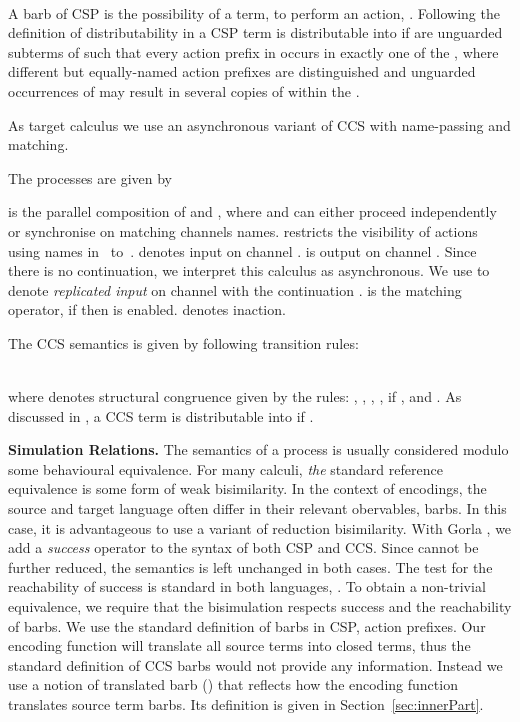 \documentclass[copyright,creativecommons]{eptcs}
\begin{document}
\vspace{-1.0em}\\
A barb of CSP is the possibility of a term, to perform an action, \ie .
Following the definition of distributability in \cite{petersNestmannGoltz13} a CSP term  is distributable into  if  are unguarded subterms of  such that every action prefix in  occurs in exactly one of the , where different but equally-named action prefixes are distinguished and unguarded occurrences of  may result in several copies of  within the .

As target calculus we use an asynchronous variant of CCS\cite{CCS} with name-passing and matching.

\begin{definition}\label{def:ccs_syntax}
  The processes  are given by
  
\end{definition}

 is the parallel composition of  and , where  and  can either proceed independently or synchronise on matching channels names.
 restricts the visibility of actions using names in~ to~.
 denotes input on channel .
 is output on channel .
Since there is no continuation, we interpret this calculus as asynchronous.
We use  to denote \emph{replicated input} on channel  with the continuation .
 is the matching operator, if  then  is enabled.
 denotes inaction.

The CCS semantics is given by following transition rules:
\vspace{-0.6em}

\vspace{-1em}\\
where  denotes structural congruence given by the rules: ,
, , ,  if , and .
As discussed in \cite{petersNestmannGoltz13}, a CCS term  is distributable into  if .

\vspace{0.5em}
\noindent
\textbf{Simulation Relations.}\;
The semantics of a process is usually considered modulo some behavioural equivalence.
For many calculi, \emph{the} standard reference equivalence is some form of weak bisimilarity.
In the context of encodings, the source and target language often differ in their relevant obervables, \ie barbs. In this case, it is advantageous to use a variant of reduction bisimilarity.
With Gorla \cite{gorla10}, we add a \emph{success} operator  to the syntax of both CSP and CCS. Since  cannot be further reduced, the semantics is left unchanged in both cases. The test for the reachability of success is standard in both languages, \ie .
To obtain a non-trivial equivalence, we require that the bisimulation respects success and the reachability of barbs.
We use the standard definition of barbs in CSP, \ie action prefixes.
Our encoding function will translate all source terms into closed terms, thus the standard definition of CCS barbs would not provide any information.
Instead we use a notion of translated barb () that reflects how the encoding function translates source term barbs. Its definition is given in Section~\ref{sec:innerPart}.
\end{document}
